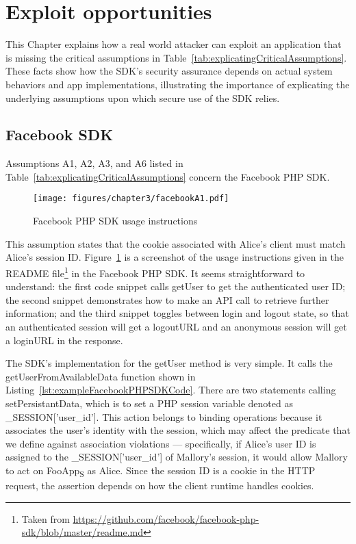 

\section{Exploit opportunities}
\label{sec:explicatingExploitOpportunities}

This Chapter explains how a real world attacker can exploit an application that is missing the critical assumptions in Table~\ref{tab:explicatingCriticalAssumptions}.  These facts show how the SDK's security assurance depends on actual system behaviors and app implementations, illustrating the importance of explicating the underlying assumptions upon which secure use of the SDK relies.  

\subsection{Facebook SDK}

Assumptions A1, A2, A3, and A6 listed in Table~\ref{tab:explicatingCriticalAssumptions} concern the Facebook PHP SDK.

\begin{figure}[hbt]
\centering
\texttt{[image: figures/chapter3/facebookA1.pdf]}
\caption{Facebook PHP SDK usage instructions}
\label{fig:facebookA1}
\end{figure}

  This assumption states that the cookie associated with Alice's client must match Alice's session ID. Figure~\ref{fig:facebookA1} is a screenshot of the usage instructions given in the README file\footnote{Taken from \url{https://github.com/facebook/facebook-php-sdk/blob/master/readme.md}} in the Facebook PHP SDK.  It seems straightforward to understand: the first code snippet calls getUser to get the authenticated user ID; the second snippet demonstrates how to make an API call to retrieve further information; and the third snippet toggles between login and logout state, so that an authenticated session will get a logoutURL and an anonymous session will get a loginURL in the response.

The SDK's implementation for the getUser method is very simple. It calls the getUserFromAvailableData function shown in Listing~\ref{lst:exampleFacebookPHPSDKCode}.  There are two statements calling setPersistantData, which is to set a PHP session variable denoted as \_SESSION['user\_id'].  This action belongs to binding operations because it associates the user's identity with the session, which may affect the predicate that we define against association violations --- specifically, if Alice's user ID is assigned to the \_SESSION['user\_id'] of Mallory's session, it would allow Mallory to act on FooApp\textsubscript{S} as Alice.  Since the session ID is a cookie in the HTTP request, the assertion depends on how the client runtime handles cookies.  

